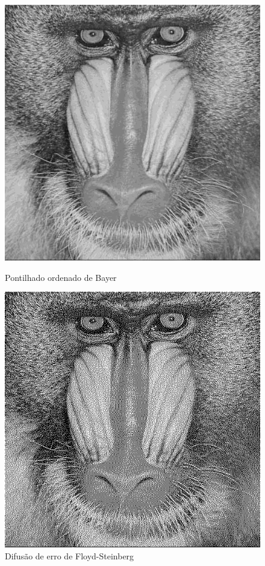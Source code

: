 \documentclass{article}
\begin{document}
\begin{figure}[!htb]
    \begin{minipage}{0.48\textwidth}
      \centering
      \includegraphics[width=.99\linewidth]{results/image_2.png}
      \caption{Pontilhado ordenado de Bayer}\label{Fig:baboon3}
    \end{minipage}\hfill
    \begin{minipage}{0.48\textwidth}
      \centering
      \includegraphics[width=.99\linewidth]{results/image_4.png}
      \caption{Difusão de erro de Floyd-Steinberg}\label{Fig:baboon4}
    \end{minipage}
 \end{figure}
\end{document}
